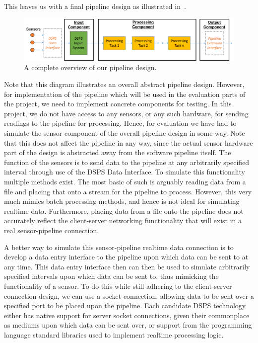 This leaves us with a final pipeline design as illustrated in~.

\begin{figure}[ht]
  \centering
  \includegraphics[width=1\textwidth]{includes/figures/fig_pipeline_whole}
  \caption{A complete overview of our pipeline design.}
  \label{fig:pipeline_whole}
\end{figure}

Note that this diagram illustrates an overall abstract pipeline design. However, for implementation of the pipeline which
will be used in the evaluation parts of the project, we need to implement concrete components for testing. In this project,
we do not have access to any sensors, or any such hardware, for sending readings to the pipeline for processing. Hence, for evaluation
we have had to simulate the sensor component of the overall pipeline design in some way. Note that this does not affect
the pipeline in any way, since the actual sensor hardware part of the design is abstracted away from the software pipeline
itself. The function of the sensors is to send data to the pipeline at any arbitrarily specified interval through use of the
DSPS Data Interface.
To simulate this functionality multiple methods exist. The most basic of such is arguably reading data from a file
and placing that onto a stream for the pipeline to process. However, this very much mimics batch processing methods, and
hence is not ideal for simulating realtime data. Furthermore, placing data from a file onto the pipeline does not accurately
reflect the client-server networking functionality that will exist in a real sensor-pipeline connection.

A better way to simulate this sensor-pipeline realtime data connection is to develop a data entry interface to the pipeline upon which data can be sent to
at any time. This data entry interface then can then be used to simulate arbitrarily specified intervals upon which data can be sent
to, thus mimicking the functionality of a sensor. To do this while still adhering to the client-server connection design,
we can use a socket connection, allowing data to be sent over a specified port to be placed upon the pipeline. Each
candidate DSPS technology either has native support for server socket connections, given their commonplace as mediums upon
which data can be sent over, or support from the programming language standard libraries used to implement realtime processing logic.

